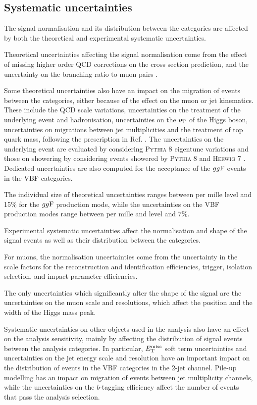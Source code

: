 \subsection{Systematic uncertainties}

The signal normalisation and its distribution between the categories
are affected by both the theoretical and experimental systematic
uncertainties.

Theoretical uncertainties affecting the signal normalisation come from
the effect of missing higher order QCD corrections on the cross section
prediction, and the uncertainty on the branching ratio to muon pairs
\cite{deFlorian:2016spz}.

Some theoretical uncertainties also have an impact on the migration
of events between the categories, either because of the effect on the muon
or jet kinematics. These include the QCD scale variations, uncertainties
on the treatment of the underlying event and hadronisation, uncertainties
on the $p_{\text{T}}$ of the Higgs boson, uncertainties on migrations between
jet multiplicities and the treatment of top quark mass, following 
the prescription in Ref. \cite{deFlorian:2016spz}. The uncertainties
on the underlying event are evaluated by considering \textsc{Pythia} 8
eigentune variations and those on showering by considering events
showered by \textsc{Pythia} 8 and \textsc{Herwig} 7 \cite{Bahr:2008pv,
Bellm:2015jjp}. Dedicated uncertainties are also computed for the
acceptance of the $gg\text{F}$ events in the VBF categories.

The individual size of theoretical uncertainties ranges between 
per mille level and 15\% for the $gg\text{F}$ production mode,
while the uncertainties on the VBF production modes range
between per mille and level and 7\%.

Experimental systematic uncertainties affect the normalisation
and shape of the signal events as well as their distribution
between the categories.

For muons, the normalisation uncertainties come from the 
uncertainty in the scale factors for the reconstruction and
identification efficiencies, trigger, isolation selection, and
impact parameter efficiencies.

The only uncertainties which significantly alter the shape of the 
signal are the uncertainties on the muon scale and resolutions,
which affect the position and the width of the Higgs mass peak.

Systematic uncertainties on other objects used in the analysis
also have an effect on the analysis sensitivity, mainly by
affecting the distribution of signal events between the analysis
categories. In particular, $E_\text{T}^\text{miss}$ soft term uncertainties and 
uncertainties on the jet energy scale and resolution have an
important impact on the distribution of events in the VBF
categories in the 2-jet channel. Pile-up modelling has an
impact on migration of events between jet multiplicity channels,
while the uncertainties on the $b$-tagging efficiency affect
the number of events that pass the analysis selection.


